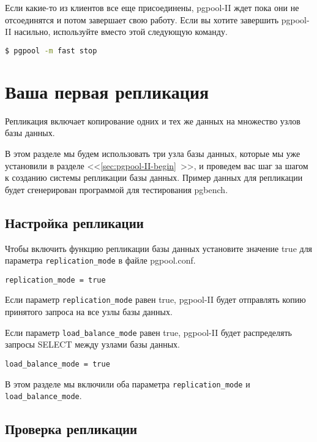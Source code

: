 Если какие-то из клиентов все еще присоединены, pgpool-II ждет пока они не отсоединятся и потом завершает свою работу. Если вы хотите завершить pgpool-II насильно, используйте вместо этой следующую команду.

\begin{lstlisting}[language=Bash,label=lst:pgpool16,caption=Остановка]
$ pgpool -m fast stop
\end{lstlisting}

\section{Ваша первая репликация}
\label{sec:pgpool-II-replica}

Репликация включает копирование одних и тех же данных на множество узлов базы данных.

В этом разделе мы будем использовать три узла базы данных, которые мы уже установили в разделе <<\ref{sec:pgpool-II-begin}~>>, и проведем вас шаг за шагом к созданию системы репликации базы данных. Пример данных для репликации будет сгенерирован программой для тестирования pgbench.

\subsection{Настройка репликации}

Чтобы включить функцию репликации базы данных установите значение true для параметра \lstinline!replication_mode! в файле pgpool.conf.

\begin{lstlisting}[label=lst:pgpool17,caption=Настройка репликации]
replication_mode = true
\end{lstlisting}

Если параметр \lstinline!replication_mode! равен true, pgpool-II будет отправлять копию принятого запроса на все узлы базы данных.

Если параметр \lstinline!load_balance_mode! равен true, pgpool-II будет распределять запросы SELECT между узлами базы данных.

\begin{lstlisting}[label=lst:pgpool18,caption=Настройка репликации]
load_balance_mode = true
\end{lstlisting}

В этом разделе мы включили оба параметра \lstinline!replication_mode! и \lstinline!load_balance_mode!.

\subsection{Проверка репликации}

